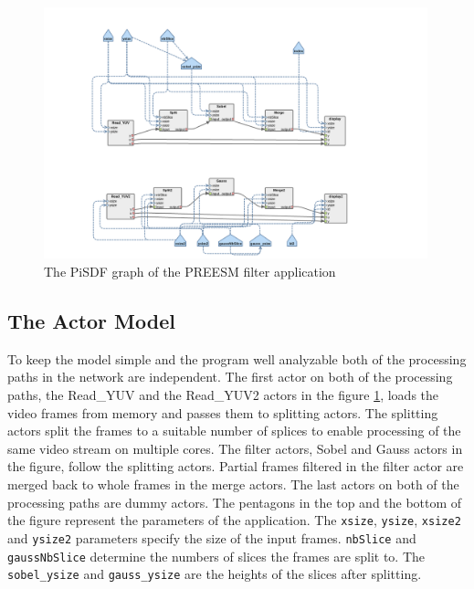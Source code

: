 \begin{figure}[h!]
    \begin{center}
        \includegraphics[width=0.99\textwidth]{images/preesm_diagram.png}
        \caption{The PiSDF graph of the PREESM filter application}
        \label{fig:preesm_actors}
    \end{center}
\end{figure}

\subsection{The Actor Model}
\label{subsec:actors}
To keep the model simple and the program well analyzable both of the processing paths in the network are independent. The first actor on both of the processing paths, the Read\_YUV and the Read\_YUV2 actors in the figure \ref{fig:preesm_actors}, loads the video frames from memory and passes them to splitting actors. The splitting actors split the frames to a suitable number of splices to enable processing of the same video stream on multiple cores. The filter actors, Sobel and Gauss actors in the figure, follow the splitting actors. Partial frames filtered in the filter actor are merged back to whole frames in the merge actors. The last actors on both of the processing paths are dummy actors. The pentagons in the top and the bottom of the figure represent the parameters of the application. The \texttt{xsize}, \texttt{ysize}, \texttt{xsize2} and \texttt{ysize2} parameters specify the size of the input frames. \texttt{nbSlice} and \texttt{gaussNbSlice} determine the numbers of slices the frames are split to. The \texttt{sobel\_ysize} and \texttt{gauss\_ysize} are the heights of the slices after splitting.

